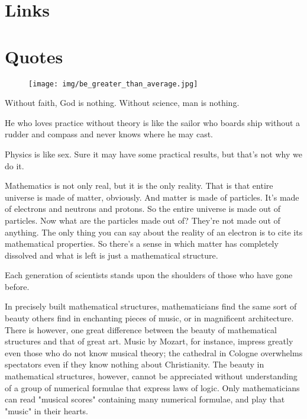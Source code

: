 \documentclass[12pt,a4paper,twoside,openright]{report}
\theoremstyle{definition}
\theoremstyle{itexmp}
\numberwithin{equation}{section}
\begin{document}
 	\chapter{Links}
	

			
	\chapter{Quotes}
	\begin{figure}[H]
		\centering
		\texttt{[image: img/be\_greater\_than\_average.jpg]}	
	\end{figure}
	\begin{fquote}Without faith, God is nothing. Without science, man is nothing.
 	\end{fquote}
 	
	\begin{fquote}He who loves practice without theory is like the sailor who boards ship without a rudder and compass and never knows where he may cast.
 	\end{fquote}
 	
	\begin{fquote}Physics is like sex. Sure it may have some practical results, but that's not why we do it.
 	\end{fquote}
 	
	\begin{fquote}Mathematics is not only real, but it is the only reality. That is that entire universe is made of matter, obviously. And matter is made of particles. It's made of electrons and neutrons and protons. So the entire universe is made out of particles. Now what are the particles made out of? They're not made out of anything. The only thing you can say about the reality of an electron is to cite its mathematical properties. So there's a sense in which matter has completely dissolved and what is left is just a mathematical structure.
 	\end{fquote}
 	
 	\begin{fquote}Each generation of scientists stands upon the shoulders of those who have gone before.
 	\end{fquote}
 	
 	\begin{fquote}In precisely built mathematical structures, mathematicians find the same sort of beauty others find in enchanting pieces of music, or in magnificent architecture. There is however, one great difference between the beauty of mathematical structures and that of great art. Music by Mozart, for instance, impress greatly even those who do not know musical theory; the cathedral in Cologne overwhelms spectators even if they know nothing about Christianity. The beauty in mathematical structures, however, cannot be appreciated without understanding of a group of numerical formulae that express laws of logic. Only mathematicians can read "musical scores" containing many numerical formulae, and play that "music" in their hearts.
 	\end{fquote}
 	
\end{document}
